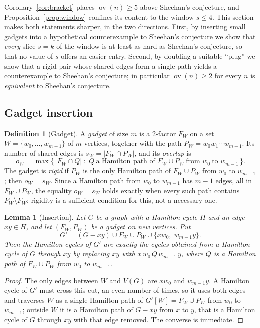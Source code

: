 \documentclass[11pt,a4paper]{article}
\newtheorem{lemma}[theorem]{Lemma}
\theoremstyle{definition}
\newtheorem{definition}[theorem]{Definition}
\theoremstyle{remark}
\newcommand{\ov}{\operatorname{ov}}
\begin{document}
Corollary~\ref{cor:bracket} places $\ov(n)\ge5$ above Sheehan's conjecture, and Proposition~\ref{prop:window} confines its content to the window $s\le4$. This section makes both statements sharper, in the two directions. First, by inserting small gadgets into a hypothetical counterexample to Sheehan's conjecture we show that \emph{every} slice $s=k$ of the window is at least as hard as Sheehan's conjecture, so that no value of $s$ offers an easier entry. Second, by doubling a suitable ``plug'' we show that a rigid pair whose shared edges form a single path yields a counterexample to Sheehan's conjecture; in particular $\ov(n)\ge2$ for every $n$ is \emph{equivalent} to Sheehan's conjecture.

\subsection{Gadget insertion}

\begin{definition}[Gadget]\label{def:insgadget}
A \emph{gadget} of size $m$ is a 2-factor $F_W$ on a set $W=\{w_0,\dots,w_{m-1}\}$ of $m$ vertices, together with the path $P_W=w_0w_1\cdots w_{m-1}$. Its number of shared edges is $s_W=|F_W\cap P_W|$, and its \emph{overlap} is
\[
o_W=\max\{\,|F_W\cap Q|\;:\;Q\ \text{a Hamilton path of }F_W\cup P_W\ \text{from }w_0\ \text{to }w_{m-1}\,\}.
\]
The gadget is \emph{rigid} if $P_W$ is the only Hamilton path of $F_W\cup P_W$ from $w_0$ to $w_{m-1}$; then $o_W=s_W$. Since a Hamilton path from $w_0$ to $w_{m-1}$ has $m-1$ edges, all in $F_W\cup P_W$, the equality $o_W=s_W$ holds exactly when every such path contains $P_W\setminus F_W$; rigidity is a sufficient condition for this, not a necessary one.
\end{definition}

\begin{lemma}[Insertion]\label{lem:insertion}
Let $G$ be a graph with a Hamilton cycle $H$ and an edge $xy\in H$, and let $(F_W,P_W)$ be a gadget on new vertices. Put
\[
G'=(G-xy)\cup F_W\cup P_W\cup\{xw_0,\;w_{m-1}y\}.
\]
Then the Hamilton cycles of $G'$ are exactly the cycles obtained from a Hamilton cycle of $G$ through $xy$ by replacing $xy$ with $x\,w_0\,Q\,w_{m-1}\,y$, where $Q$ is a Hamilton path of $F_W\cup P_W$ from $w_0$ to $w_{m-1}$.
\end{lemma}

\begin{proof}
The only edges between $W$ and $V(G)$ are $xw_0$ and $w_{m-1}y$. A Hamilton cycle of $G'$ must cross this cut, an even number of times, so it uses both edges and traverses $W$ as a single Hamilton path of $G'[W]=F_W\cup P_W$ from $w_0$ to $w_{m-1}$; outside $W$ it is a Hamilton path of $G-xy$ from $x$ to $y$, that is a Hamilton cycle of $G$ through $xy$ with that edge removed. The converse is immediate.
\end{proof}
\end{document}
